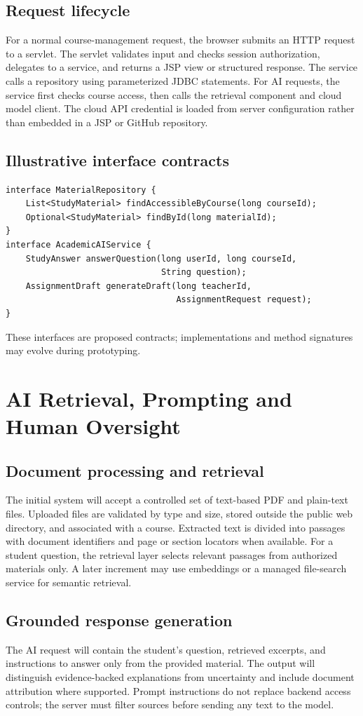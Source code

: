 \documentclass[11pt,a4paper]{article}
\begin{document}
\subsection{Request lifecycle}
For a normal course-management request, the browser submits an HTTP request to a servlet. The servlet validates input and checks session authorization, delegates to a service, and returns a JSP view or structured response. The service calls a repository using parameterized JDBC statements. For AI requests, the service first checks course access, then calls the retrieval component and cloud model client. The cloud API credential is loaded from server configuration rather than embedded in a JSP or GitHub repository.
\subsection{Illustrative interface contracts}
\begin{verbatim}
interface MaterialRepository {
    List<StudyMaterial> findAccessibleByCourse(long courseId);
    Optional<StudyMaterial> findById(long materialId);
}
interface AcademicAIService {
    StudyAnswer answerQuestion(long userId, long courseId,
                               String question);
    AssignmentDraft generateDraft(long teacherId,
                                  AssignmentRequest request);
}
\end{verbatim}
These interfaces are proposed contracts; implementations and method signatures may evolve during prototyping.

\section{AI Retrieval, Prompting and Human Oversight}
\subsection{Document processing and retrieval}
The initial system will accept a controlled set of text-based PDF and plain-text files. Uploaded files are validated by type and size, stored outside the public web directory, and associated with a course. Extracted text is divided into passages with document identifiers and page or section locators when available. For a student question, the retrieval layer selects relevant passages from authorized materials only. A later increment may use embeddings or a managed file-search service for semantic retrieval.
\subsection{Grounded response generation}
The AI request will contain the student's question, retrieved excerpts, and instructions to answer only from the provided material. The output will distinguish evidence-backed explanations from uncertainty and include document attribution where supported. Prompt instructions do not replace backend access controls; the server must filter sources before sending any text to the model.
\end{document}
